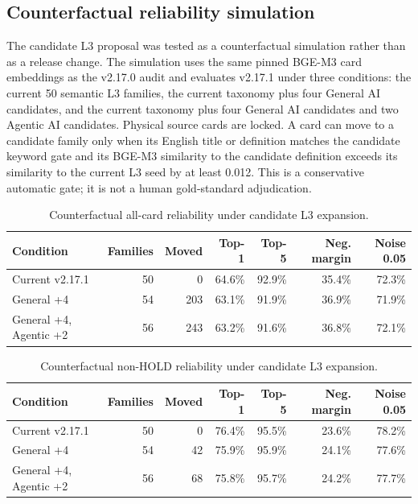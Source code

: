 \documentclass[11pt,a4paper]{article}
\begin{document}
\begin{appendices}
\subsection{Counterfactual reliability simulation}

The candidate L3 proposal was tested as a counterfactual simulation rather
than as a release change. The simulation uses the same pinned BGE-M3 card
embeddings as the v2.17.0 audit and evaluates v2.17.1 under three conditions:
the current 50 semantic L3 families, the current taxonomy plus four General AI
candidates, and the current taxonomy plus four General AI candidates and two
Agentic AI candidates. Physical source cards are locked. A card can move to a
candidate family only when its English title or definition matches the
candidate keyword gate and its BGE-M3 similarity to the candidate definition
exceeds its similarity to the current L3 seed by at least 0.012. This is a
conservative automatic gate; it is not a human gold-standard adjudication.

\begin{table}[ht]
\centering
\caption{Counterfactual all-card reliability under candidate L3 expansion.}
\label{tab:l3-expansion-sim-all}
\small
\setlength{\tabcolsep}{4.5pt}
\begin{tabular}{lrrrrrr}
\toprule
Condition & Families & Moved & Top-1 & Top-5 & Neg. margin & Noise 0.05 \\
\midrule
Current v2.17.1 & 50 & 0 & 64.6\% & 92.9\% & 35.4\% & 72.3\% \\
General +4 & 54 & 203 & 63.1\% & 91.9\% & 36.9\% & 71.9\% \\
General +4, Agentic +2 & 56 & 243 & 63.2\% & 91.6\% & 36.8\% & 72.1\% \\
\bottomrule
\end{tabular}
\end{table}

\begin{table}[ht]
\centering
\caption{Counterfactual non-HOLD reliability under candidate L3 expansion.}
\label{tab:l3-expansion-sim-nonhold}
\small
\setlength{\tabcolsep}{4.5pt}
\begin{tabular}{lrrrrrr}
\toprule
Condition & Families & Moved & Top-1 & Top-5 & Neg. margin & Noise 0.05 \\
\midrule
Current v2.17.1 & 50 & 0 & 76.4\% & 95.5\% & 23.6\% & 78.2\% \\
General +4 & 54 & 42 & 75.9\% & 95.9\% & 24.1\% & 77.6\% \\
General +4, Agentic +2 & 56 & 68 & 75.8\% & 95.7\% & 24.2\% & 77.7\% \\
\bottomrule
\end{tabular}
\end{table}


\end{appendices}
\end{document}
